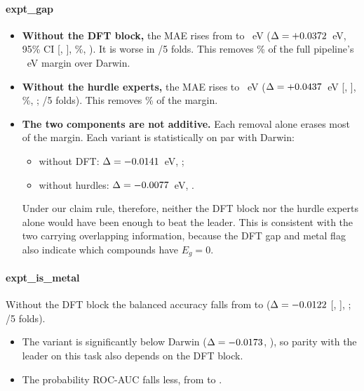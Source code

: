 \paragraph{expt\_gap}
\begin{itemize}
\item \textbf{Without the DFT block,} the MAE rises from \AtwoFinalGap{} to \AblNoDftGap{}~eV ($\Delta=+0.0372$~eV, 95\% CI [\AblNoDftGapCIlo, \AblNoDftGapCIhi], \AblNoDftGapRel\%, \AblNoDftGapPExpr). It is worse in \AblNoDftGapFoldsWorse/5 folds. This removes \AblNoDftGapShareOfLeaderGain\% of the full pipeline's \AtwoDeltaGap~eV margin over Darwin.
\item \textbf{Without the hurdle experts,} the MAE rises to \AblNoHurdleGap{}~eV ($\Delta=+0.0437$~eV [\AblNoHurdleGapCIlo, \AblNoHurdleGapCIhi], \AblNoHurdleGapRel\%, \AblNoHurdleGapPExpr; \AblNoHurdleGapFoldsWorse/5 folds). This removes \AblNoHurdleGapShareOfLeaderGain\% of the margin.
\item \textbf{The two components are not additive.} Each removal alone erases most of the margin. Each variant is statistically on par with Darwin:
  \begin{itemize}
  \item without DFT: $\Delta=-0.0141$~eV, \AblNoDftGapVsLeaderPExpr;
  \item without hurdles: $\Delta=-0.0077$~eV, \AblNoHurdleGapVsLeaderPExpr.
  \end{itemize}
  Under our claim rule, therefore, neither the DFT block nor the hurdle experts alone would have been enough to beat the leader. This is consistent with the two carrying overlapping information, because the DFT gap and metal flag also indicate which compounds have $E_g=0$.
\end{itemize}

\paragraph{expt\_is\_metal}
Without the DFT block the balanced accuracy falls from \AtwoFinalMetal{} to \AblNoDftMetal{} ($\Delta=-0.0122$ [\AblNoDftMetalCIlo, \AblNoDftMetalCIhi], \AblNoDftMetalPExpr; \AblNoDftMetalFoldsWorse/5 folds).
\begin{itemize}
\item The variant is significantly below Darwin ($\Delta=-0.0173$, \AblNoDftMetalVsLeaderPExpr), so parity with the leader on this task also depends on the DFT block.
\item The probability ROC-AUC falls less, from \AblNoDftMetalAtwoAUC{} to \AblNoDftMetalAUC.
\end{itemize}

